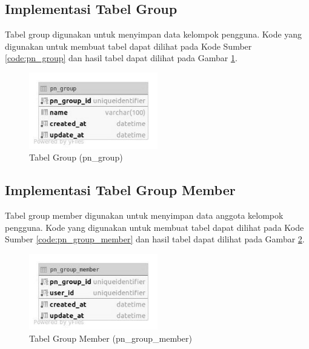 \subsection{Implementasi Tabel Group}
\par Tabel group digunakan untuk menyimpan data kelompok pengguna. Kode yang digunakan untuk membuat tabel dapat dilihat pada Kode Sumber \ref{code:pn_group} dan hasil tabel dapat dilihat pada Gambar \ref{tabel_pn_group}.

\begin{figure}[H]
    \centering\includegraphics[width=0.5\textwidth]{bab4/figures/tabel_pn_group.jpg}
    \caption{Tabel Group (pn\_group)}
    \label{tabel_pn_group}
\end{figure}

\subsection{Implementasi Tabel Group Member}
\par Tabel group member digunakan untuk menyimpan data anggota kelompok pengguna. Kode yang digunakan untuk membuat tabel dapat dilihat pada Kode Sumber \ref{code:pn_group_member} dan hasil tabel dapat dilihat pada Gambar \ref{tabel_pn_group_member}.

\begin{figure}[H]
    \centering\includegraphics[width=0.5\textwidth]{bab4/figures/tabel_pn_group_member.jpg}
    \caption{Tabel Group Member (pn\_group\_member)}
    \label{tabel_pn_group_member}
\end{figure}

